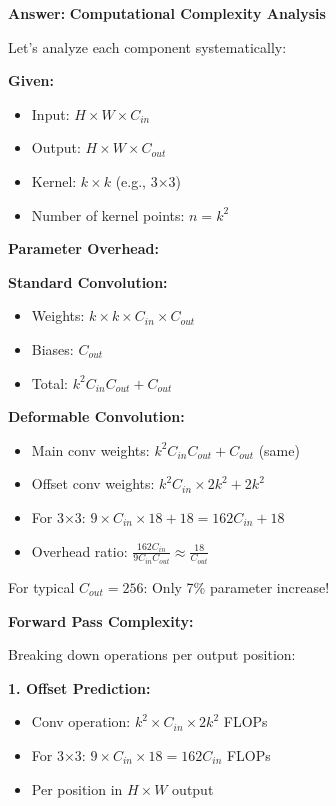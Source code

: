 \documentclass[12pt]{article}
\newcommand{\answer}[1]{{\color{answercolor}\textbf{Answer:} #1}}
\newcommand{\explanation}[1]{{\color{explanationcolor}#1}}
\begin{document}
\begin{enumerate}[(a)]
    \answer{
    \textbf{Computational Complexity Analysis}
    
    \explanation{
    Let's analyze each component systematically:
    
    \textbf{Given:}
    \begin{itemize}
        \item Input: $H \times W \times C_{in}$
        \item Output: $H \times W \times C_{out}$
        \item Kernel: $k \times k$ (e.g., 3×3)
        \item Number of kernel points: $n = k^2$
    \end{itemize}
    }
    
    \textbf{Parameter Overhead:}
    
    \explanation{
    \textbf{Standard Convolution:}
    \begin{itemize}
        \item Weights: $k \times k \times C_{in} \times C_{out}$
        \item Biases: $C_{out}$
        \item Total: $k^2 C_{in} C_{out} + C_{out}$
    \end{itemize}
    
    \textbf{Deformable Convolution:}
    \begin{itemize}
        \item Main conv weights: $k^2 C_{in} C_{out} + C_{out}$ (same)
        \item Offset conv weights: $k^2 C_{in} \times 2k^2 + 2k^2$
        \item For 3×3: $9 \times C_{in} \times 18 + 18 = 162C_{in} + 18$
        \item Overhead ratio: $\frac{162C_{in}}{9C_{in}C_{out}} \approx \frac{18}{C_{out}}$
    \end{itemize}
    
    For typical $C_{out} = 256$: Only 7\% parameter increase!
    }
    
    \textbf{Forward Pass Complexity:}
    
    \explanation{
    Breaking down operations per output position:
    
    \textbf{1. Offset Prediction:}
    \begin{itemize}
        \item Conv operation: $k^2 \times C_{in} \times 2k^2$ FLOPs
        \item For 3×3: $9 \times C_{in} \times 18 = 162C_{in}$ FLOPs
        \item Per position in $H \times W$ output
    \end{itemize}
    
}}
\end{enumerate}
\end{document}
